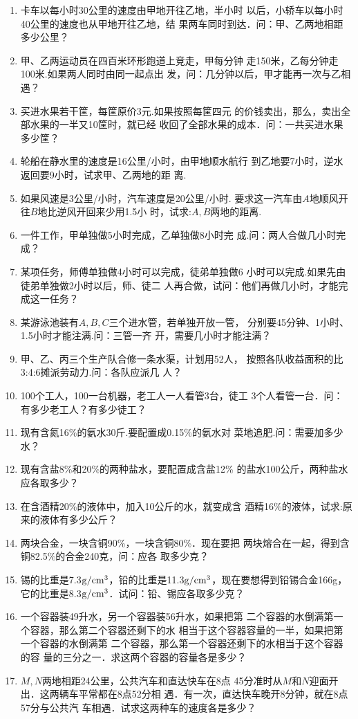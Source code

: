 \begin{enumerate}
\item  卡车以每小时30公里的速度由甲地开往乙地，半小时
以后，小轿车以每小时40公里的速度也从甲地开往乙地，结
果两车同时到达．问：甲、乙两地相距多少公里？
\item  甲、乙两运动员在四百米环形跑道上竞走，甲每分钟
走150米，乙每分钟走100米.如果两人同时由同一起点出
发，问：几分钟以后，甲才能再一次与乙相遇？
\item  买进水果若干筐，每筐原价3元.如果按照每筐四元
的价钱卖出，那么，卖出全部水果的一半又10筐时，就已经
收回了全部水果的成本．问：一共买进水果多少筐？
\item  轮船在静水里的速度是16公里/小时，由甲地顺水航行
到乙地要7小时，逆水返回要9小时，试求甲、乙两地的距
离.
\item  如果风速是3公里/小时，汽车速度是20公里/小时.
要求这一汽车由$A$地顺风开往$B$地比逆风开回来少用1.5小
时，试求:$A,B$两地的距离.
\item  一件工作，甲单独做5小时完成，乙单独做8小时完
成.问：两人合做几小时完成？
\item  某项任务，师傅单独做4小时可以完成，徒弟单独做6
小时可以完成.如果先由徒弟单独做2小时以后，师、徒二
人再合做，试问：他们再做几小时，才能完成这一任务？
\item  某游泳池装有$A, B, C$三个进水管，若单独开放一管，
分别要45分钟、1小时、1.5小时才能注满.问：三管一齐
开，需要几小时才能注满？
\item  甲、乙、丙三个生产队合修一条水渠，计划用52人，
按照各队收益面积的比3:4:6摊派劳动力.问：各队应派几
人？
\item  100个工人，100一台机器，老工人一人看管3台，徒工
3个人看管一台．问：有多少老工人？有多少徒工？
\item  现有含氮16\%的氨水30斤.要配置成0.15\%的氨水对
菜地追肥.问：需要加多少水？
\item  现有含盐8\%和20\%的两种盐水，要配置成含盐12\%
的盐水100公斤，两种盐水应各取多少？

\item  在含酒精20\%的液体中，加入10公斤的水，就变成含
酒精16\%的液体，试求:原来的液体有多少公斤？
\item  两块合金，一块含铜90\%，一块含铜80\%．现在要把
两块熔合在一起，得到含铜82.5\%的合金240克，问：应各
取多少克？

\item 锡的比重是7.3${\rm g}/{\rm cm}^3$，铅的比重是11.3${\rm g}/{\rm cm}^3$，现在要想得到铅锡合金166g，它的比重是8.3${\rm g}/{\rm cm}^3$．试问：铅、锡应各取多少克？

\item 一个容器装49升水，另一个容器装56升水，如果把第
二个容器的水倒满第一个容器，那么第二个容器还剩下的水
相当于这个容器容量的一半，如果把第一个容器的水倒满第
二个容器，那么第一个容器还剩下的水相当于这个容器的容
量的三分之一．求这两个容器的容量各是多少？
\item $M, N$两地相距24公里，公共汽车和直达快车在8点
45分准时从$M$和$N$迎面开出．这两辆车平常都在8点52分相
遇．有一次，直达快车晚开8分钟，就在8点57分与公共汽
车相遇．试求这两种车的速度各是多少？

\end{enumerate}

